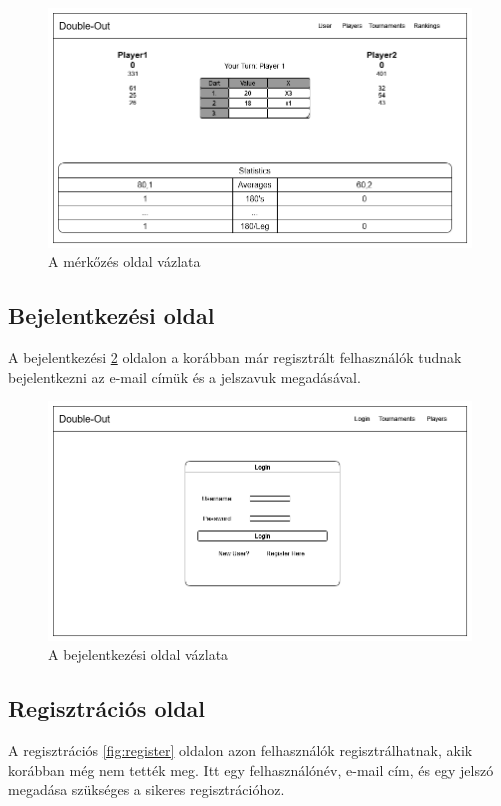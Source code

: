 \begin{figure}[h]
\centering
\includegraphics[scale=0.4]{images/MatchPage.png}
\caption{A mérkőzés oldal vázlata}
\label{fig:match}
\end{figure}

\subsection{Bejelentkezési oldal}
A bejelentkezési \ref{fig:login} oldalon a korábban már regisztrált felhasználók tudnak bejelentkezni az e-mail címük és a jelszavuk megadásával.

\begin{figure}[h]
\centering
\includegraphics[scale=0.4]{images/Login.png}
\caption{A bejelentkezési oldal vázlata}
\label{fig:login}
\end{figure}

\subsection{Regisztrációs oldal}
A regisztrációs \ref{fig:register} oldalon azon felhasználók regisztrálhatnak, akik korábban még nem tették meg. Itt egy felhasználónév, e-mail cím, és egy jelszó megadása szükséges a sikeres regisztrációhoz.

